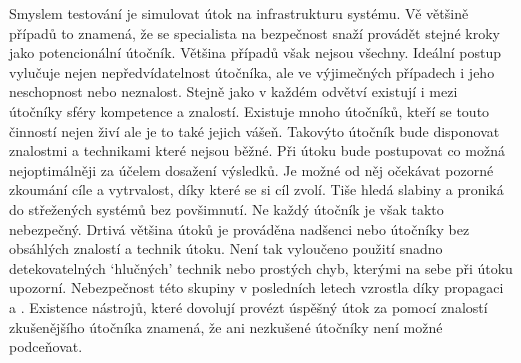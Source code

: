 Smyslem testování je simulovat útok na infrastrukturu systému.
Vě většině případů to znamená, že se specialista na bezpečnost snaží provádět stejné kroky jako potencionální útočník.
Většina případů však nejsou všechny.
Ideální postup vylučuje nejen nepředvídatelnost útočníka, ale ve výjimečných případech i jeho neschopnost nebo neznalost.
Stejně jako v každém odvětví existují i mezi útočníky sféry kompetence a znalostí.
Existuje mnoho útočníků, kteří se touto činností nejen živí ale je to také jejich vášeň.
Takovýto útočník bude disponovat znalostmi a technikami které nejsou běžné.
Při útoku bude postupovat co možná nejoptimálněji za účelem dosažení výsledků.
Je možné od něj očekávat pozorné zkoumání cíle a vytrvalost, díky které se si cíl zvolí.
Tiše hledá slabiny a proniká do střežených systémů bez povšimnutí.
Ne každý útočník je však takto nebezpečný.
Drtivá většina útoků je prováděna nadšenci nebo útočníky bez obsáhlých znalostí a technik útoku.
Není tak vyloučeno použití snadno detekovatelných `hlučných' technik nebo prostých chyb, kterými na sebe při útoku upozorní.
Nebezpečnost této skupiny v posledních letech vzrostla díky propagaci \cite{MaaS_ATaT} a \cite{RaaS_microsoft}.
Existence nástrojů, které dovolují provézt úspěšný útok za pomocí znalostí zkušenějšího útočníka znamená, že ani nezkušené útočníky není možné podceňovat.

